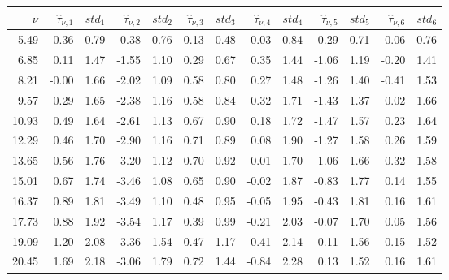 \documentclass{article}
\begin{document}
\begin{tabular}{rrrrrrrrrrrrr}\hline 
 $\nu$ & $\widehat{\tau}_{\nu,1}$ & $std_1$ & $\widehat{\tau}_{\nu,2}$ & $std_2$ & $\widehat{\tau}_{\nu,3}$ & $std_3$ & $\widehat{\tau}_{\nu,4}$ & $std_4$ &  $\widehat{\tau}_{\nu,5}$ & $std_5$ & $\widehat{\tau}_{\nu,6}$ & $std_6$ \\ \hline 
    5.49 &     0.36 &     0.79 &    -0.38 &     0.76  &     0.13 &     0.48 &     0.03 &     0.84 &    -0.29 &     0.71  &    -0.06 &     0.76 \\ 
    6.85 &     0.11 &     1.47 &    -1.55 &     1.10  &     0.29 &     0.67 &     0.35 &     1.44 &    -1.06 &     1.19  &    -0.20 &     1.41 \\ 
    8.21 &    -0.00 &     1.66 &    -2.02 &     1.09  &     0.58 &     0.80 &     0.27 &     1.48 &    -1.26 &     1.40  &    -0.41 &     1.53 \\ 
    9.57 &     0.29 &     1.65 &    -2.38 &     1.16  &     0.58 &     0.84 &     0.32 &     1.71 &    -1.43 &     1.37  &     0.02 &     1.66 \\ 
   10.93 &     0.49 &     1.64 &    -2.61 &     1.13  &     0.67 &     0.90 &     0.18 &     1.72 &    -1.47 &     1.57  &     0.23 &     1.64 \\ 
   12.29 &     0.46 &     1.70 &    -2.90 &     1.16  &     0.71 &     0.89 &     0.08 &     1.90 &    -1.27 &     1.58  &     0.26 &     1.59 \\ 
   13.65 &     0.56 &     1.76 &    -3.20 &     1.12  &     0.70 &     0.92 &     0.01 &     1.70 &    -1.06 &     1.66  &     0.32 &     1.58 \\ 
   15.01 &     0.67 &     1.74 &    -3.46 &     1.08  &     0.65 &     0.90 &    -0.02 &     1.87 &    -0.83 &     1.77  &     0.14 &     1.55 \\ 
   16.37 &     0.89 &     1.81 &    -3.49 &     1.10  &     0.48 &     0.95 &    -0.05 &     1.95 &    -0.43 &     1.81  &     0.16 &     1.61 \\ 
   17.73 &     0.88 &     1.92 &    -3.54 &     1.17  &     0.39 &     0.99 &    -0.21 &     2.03 &    -0.07 &     1.70  &     0.05 &     1.56 \\ 
   19.09 &     1.20 &     2.08 &    -3.36 &     1.54  &     0.47 &     1.17 &    -0.41 &     2.14 &     0.11 &     1.56  &     0.15 &     1.52 \\ 
   20.45 &     1.69 &     2.18 &    -3.06 &     1.79  &     0.72 &     1.44 &    -0.84 &     2.28 &     0.13 &     1.52  &     0.16 &     1.61 \\ 

\end{tabular}
\end{document}
